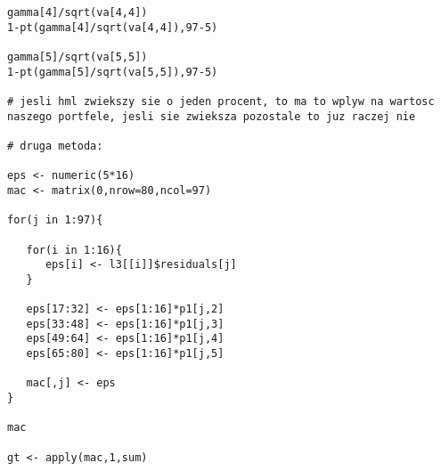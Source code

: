 \documentclass[11pt,a4paper]{report}
\begin{document}
\begin{small}
\begin{lstlisting}
gamma[4]/sqrt(va[4,4])
1-pt(gamma[4]/sqrt(va[4,4]),97-5)

gamma[5]/sqrt(va[5,5])
1-pt(gamma[5]/sqrt(va[5,5]),97-5)

# jesli hml zwiekszy sie o jeden procent, to ma to wplyw na wartosc naszego portfele, jesli sie zwieksza pozostale to juz raczej nie

# druga metoda:

eps <- numeric(5*16)
mac <- matrix(0,nrow=80,ncol=97)

for(j in 1:97){
   
   for(i in 1:16){
      eps[i] <- l3[[i]]$residuals[j]
   }
   
   eps[17:32] <- eps[1:16]*p1[j,2]
   eps[33:48] <- eps[1:16]*p1[j,3]
   eps[49:64] <- eps[1:16]*p1[j,4]
   eps[65:80] <- eps[1:16]*p1[j,5]
   
   mac[,j] <- eps
}

mac

gt <- apply(mac,1,sum)
\end{lstlisting} 
\end{small} 
 
\end{document}
